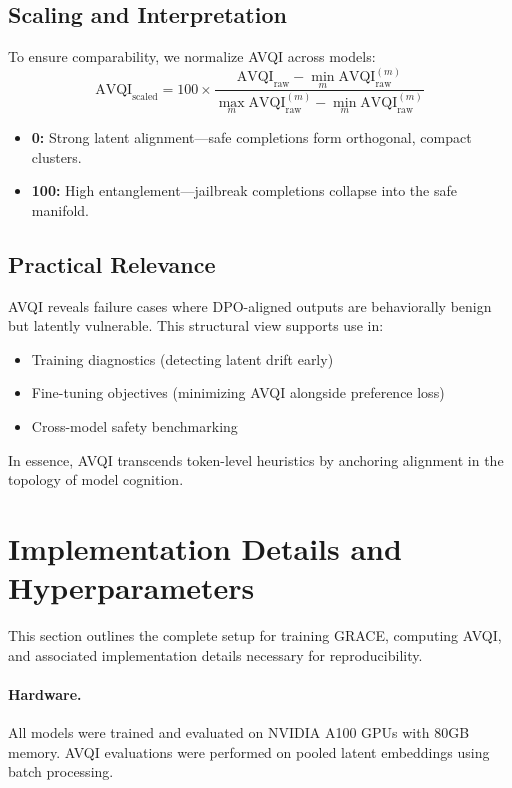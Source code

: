 \subsection*{Scaling and Interpretation}
To ensure comparability, we normalize AVQI across models:
\[ \mathrm{AVQI}_{\text{scaled}} = 100 \times \frac{\mathrm{AVQI}_{\text{raw}} - \min_m \mathrm{AVQI}_{\text{raw}}^{(m)}}{\max_m \mathrm{AVQI}_{\text{raw}}^{(m)} - \min_m \mathrm{AVQI}_{\text{raw}}^{(m)}} \]

\begin{itemize}
    \item \textbf{0:} Strong latent alignment—safe completions form orthogonal, compact clusters.
    \item \textbf{100:} High entanglement—jailbreak completions collapse into the safe manifold.
\end{itemize}

\subsection*{Practical Relevance}
AVQI reveals failure cases where DPO-aligned outputs are behaviorally benign but latently vulnerable. This structural view supports use in:
\begin{itemize}
    \item Training diagnostics (detecting latent drift early)
    \item Fine-tuning objectives (minimizing AVQI alongside preference loss)
    \item Cross-model safety benchmarking
\end{itemize}

In essence, AVQI transcends token-level heuristics by anchoring alignment in the topology of model cognition.





\section{Implementation Details and Hyperparameters}
\label{sec:appendix_implementation}

This section outlines the complete setup for training \textsc{GRACE}, computing AVQI, and associated implementation details necessary for reproducibility.

\paragraph{Hardware.} All models were trained and evaluated on NVIDIA A100 GPUs with 80GB memory. AVQI evaluations were performed on pooled latent embeddings using batch processing.

